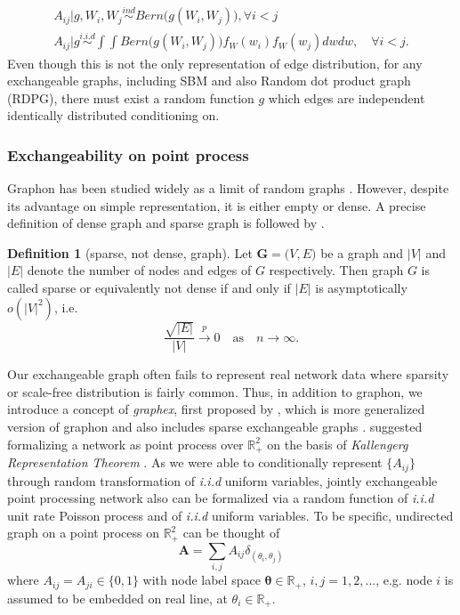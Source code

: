 \documentclass[12pt]{article}
\theoremstyle{definition}
\newtheorem{definition}{Definition}[section]
\begin{document}
\begin{equation} 
\begin{gathered}
A_{ij} \big| g, W_{i}, W_{j} \overset{ind}{\sim} Bern \big( g(W_{i}, W_{j})  \big), \forall i < j \\ 
A_{ij} \big| g \overset{i.i.d}{\sim} \int \int Bern \big( g(W_{i}, W_{j}) \big) f_{W}(w_{i}) f_{W}(w_{j}) dw dw, \quad \forall i < j.  
\end{gathered}
\end{equation}
Even though this is not the only representation of edge distribution, for any exchangeable graphs, including SBM and also Random dot product graph (RDPG), there must exist a random function $g$ which edges are independent identically distributed conditioning on. 
	
\subsubsection{Exchangeability on point process}
	
Graphon has been studied widely as a limit of random graphs \citep{lovasz2006limits}. However, despite its advantage on simple representation, it is either empty or dense. A precise definition of dense graph and sparse graph is followed by \cite{veitch2015class}. 
\begin{definition}[sparse, not dense, graph]
Let $\mathbf{G} = \big(  V, E \big)$ be a graph and $|V|$ and $|E|$ denote the number of nodes and edges of $G$ respectively. Then graph $G$ is called sparse or equivalently not dense if and only if $|E|$ is asymptotically $o(|V|^2)$, i.e.
\begin{equation}
\frac{\sqrt{|E|}}{|V|} \xrightarrow{p} 0 \quad \mbox{as} \quad n \rightarrow \infty.
\end{equation}
\end{definition}
Our exchangeable graph often fails to represent real network data where sparsity or scale-free distribution is fairly common. Thus, in addition to graphon, we introduce a concept of \textit{graphex}, first proposed by \cite{veitch2015class}, which is more generalized version of graphon and also includes sparse exchangeable graphs \citep{caron2014sparse}.  \cite{caron2014sparse} suggested formalizing a network as point process over $\mathbb{R}^2_{+}$ on the basis of \textit{Kallengerg Representation Theorem} \citep{kallenberg1990exchangeable}. As we were able to conditionally represent $\{ A_{ij} \}$ through random transformation of \textit{i.i.d} uniform variables, jointly exchangeable point processing network also can be formalized via a random function of \textit{i.i.d} unit rate Poisson process and of \textit{i.i.d} uniform variables. 
To be specific, undirected graph on a point process on $\mathbb{R}^2_{+}$ can be thought of 
\begin{equation}
\mathbf{A} = \sum\limits_{i,j} A_{ij} \delta_{( \theta_{i}, \theta_{j})} 
\end{equation}	
where $A_{ij} = A_{ji} \in \{ 0 , 1  \}$ with node label space $\mathbf{\theta} \in \mathbb{R}_{+}$, $i,j = 1,2,...$, e.g.  node $i$ is assumed to be embedded on real line, at $\theta_{i} \in \mathbb{R}_{+}$. 	
				
\end{document}
